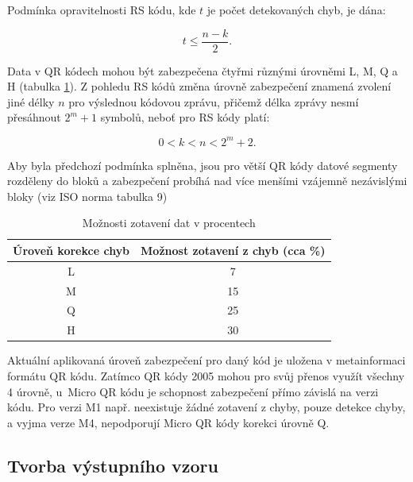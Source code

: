 Podmínka opravitelnosti RS kódu, kde $t$ je počet
detekovaných chyb, je dána: \cite{sklarRSCodes}

\begin{equation}
  t \leq \frac{n - k}{2}\mbox{.}
\end{equation}

Data v QR kódech mohou být zabezpečena čtyřmi různými úrovněmi L, M, Q a H
(tabulka \ref{moznostiZotaveniTabulka}). Z pohledu RS kódů změna úrovně
zabezpečení znamená zvolení jiné délky $n$ pro výslednou kódovou zprávu, přičemž délka zprávy nesmí přesáhnout 
$2^m+1$ symbolů, neboť pro RS kódy platí: \cite{sklarRSCodes}

\begin{equation}
  0 < k < n < 2^{m} + 2\mbox{.}
\end{equation}

Aby byla předchozí podmínka splněna, jsou pro větší QR kódy datové segmenty
rozděleny do bloků a zabezpečení probíhá nad více menšími vzájemně nezávislými
bloky (viz ISO norma tabulka 9)

\begin{table}[H]
  \begin{center} 
    \begin{tabular}{| c | c |} \hline
    \textbf{Úroveň korekce chyb} & \textbf{Možnost zotavení z chyb (cca \%)} \\ \hline
    L & 7 \\ \hline
    M & 15 \\ \hline
    Q & 25 \\ \hline
    H & 30 \\ \hline
    \end{tabular}
    \caption{Možnosti zotavení dat v procentech}
    \label{moznostiZotaveniTabulka}
  \end{center}
\end{table}

Aktuální aplikovaná úroveň zabezpečení pro daný kód je uložena v metainformaci
formátu QR kódu. Zatímco QR kódy 2005 mohou pro svůj přenos využít všechny 4 
úrovně, u~Micro QR kódu je schopnost zabezpečení přímo závislá na verzi kódu.
Pro verzi M1 např. neexistuje žádné zotavení z chyby, pouze detekce
chyby, a vyjma verze M4, nepodporují Micro QR kódy korekci úrovně Q.

\clearpage
\subsection{Tvorba výstupního vzoru}
\label{tvorbaVystupnihoVzoru}

